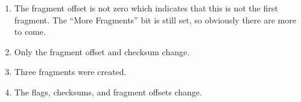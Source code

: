 \documentclass[12pt]{article}
\begin{document}
\begin{enumerate}
    \item The fragment offset is not zero which indicates that this is not the first fragment. The ``More Fragments'' bit is still set, so obviously there are more to come.
    \item Only the fragment offset and checksum change.

    \item Three fragments were created.
    \item The flags, checksums, and fragment offsets change.
\end{enumerate}
\end{document}

